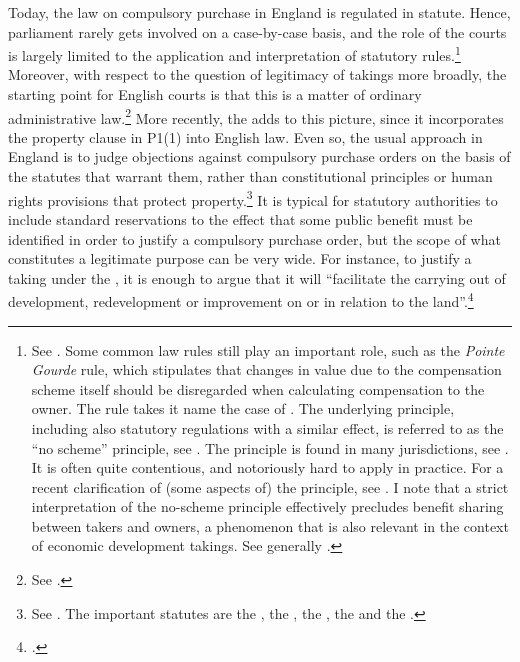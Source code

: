 Today, the law on compulsory purchase in England is regulated in statute. Hence, parliament rarely gets involved on a case-by-case basis, and the role of the courts is largely limited to the application and interpretation of statutory rules.\footnote{See \cite[116-121]{waring09}. Some common law rules still play an important role, such as the {\it Pointe Gourde} rule, which stipulates that changes in value due to the compensation scheme itself should be disregarded when calculating compensation to the owner. The rule takes it name the case of \cite{gourde47}. The underlying principle, including also statutory regulations with a similar effect, is referred to as the ``no scheme'' principle, see \cite{lawcom01}. The principle is found in many jurisdictions, see \cite{sluysmans14}. It is often quite contentious, and notoriously hard to apply in practice. For a recent clarification of (some aspects of) the principle, see \cite{waters04}. I note that a strict interpretation of the no-scheme principle effectively precludes benefit sharing between takers and owners, a phenomenon that is also relevant in the context of economic development takings. See generally \cite{dyrkolbotn15}.} Moreover, with respect to the question of legitimacy of takings more broadly, the starting point for English courts is that this is a matter of ordinary administrative law.\footnote{See \cite{taggart98}.} More recently, the \cite{hra98} adds to this picture, since it incorporates the property clause in P1(1) into English law. Even so, the usual approach in England is to judge objections against compulsory purchase orders on the basis of the statutes that warrant them, rather than constitutional principles or human rights provisions that protect property.\footnote{See \cite[121-132]{waring09}. The important statutes are the \cite{ala81}, the \cite{lca61}, the \cite{cpa65}, the \cite{tcpa90} and the \cite{pcpa04}.} It is typical for statutory authorities to include standard reservations to the effect that some public benefit must be identified in order to justify a compulsory purchase order, but the scope of what constitutes a legitimate purpose can be very wide. For instance, to justify a taking under the \cite{tcpa90}, it is enough to argue that it will ``facilitate the carrying out of development, redevelopment or improvement on or in relation to the land''.\footcite[226]{tcpa90} 

